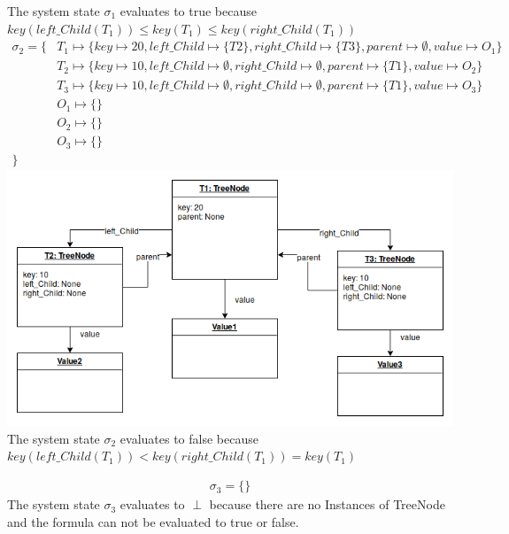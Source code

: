 \documentclass{scrartcl}
\begin{document}
\begin{itemize}
	The system state $\sigma_{1}$ evaluates to true because $key(left\_Child(T_{1})) \leq key(T_{1}) \leq
	key(right\_Child(T_{1}))$
	\newpage
	\begin{align*}
	\sigma_{2} = \{
	&T_{1}\mapsto \{key\mapsto 20,
	left\_Child \mapsto \{T2\},
	right\_Child \mapsto \{T3\},
	parent \mapsto \emptyset,
	value \mapsto O_1
	\}\\
	&T_{2}\mapsto \{key\mapsto 10,
	left\_Child \mapsto \emptyset,
	right\_Child \mapsto \emptyset,
	parent \mapsto \{T1\},
	value \mapsto O_2
	\}\\
	&T_{3}\mapsto \{key\mapsto 10,
	left\_Child \mapsto \emptyset,
	right\_Child \mapsto \emptyset,
	parent \mapsto \{T1\},
	value \mapsto O_3
	\}\\
	&O_1\mapsto \{\}\\
	&O_2\mapsto \{\}\\
	&O_3\mapsto \{\}\\
	\}
	\end{align*}
	\includegraphics*[scale=0.5]{1b.png}\\
	The system state $\sigma_{2}$ evaluates to false because \\ $key(left\_Child(T_{1})) < key(right\_Child(T_{1})) = key(T_{1})$
	
	\begin{align*}
	\sigma_{3} = \{\}
	\end{align*}
	The system state $\sigma_{3}$ evaluates to $\perp$ because there are no Instances of TreeNode and the formula can not be evaluated to true or false.
	
\end{itemize}
\end{document}
